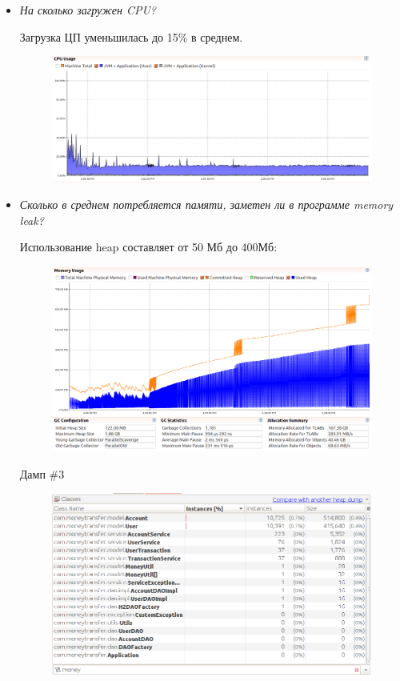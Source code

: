 \documentclass{article}
\begin{document}
	\begin{itemize}
		
		\item \textit{На сколько загружен CPU?}
		
		Загрузка ЦП уменьшилась до 15\% в среднем.
		\begin{figure}[h!] %
			\centering
			\includegraphics[width=0.95\linewidth]{img/stage_1/cpu.png}

			\label{fig:cpu1}
		\end{figure}
		
		\item \textit{Сколько в среднем потребляется памяти, заметен ли в программе memory leak?		}
		
		Использование heap составляет от 50 Мб до 400Мб:
		\begin{figure}[h!] %
			\centering
			\includegraphics[width=0.95\linewidth]{img/stage_1/memory.png}
			\label{fig:mem1}
		\end{figure}
		\newpage
		
		Дамп \#3
		\begin{figure}[h!] %
			\centering
			\includegraphics[width=0.75\linewidth]{img/stage_1/dump3.png}
			\label{fig:dmp31}
		\end{figure}
		

\end{itemize}
\end{document}
